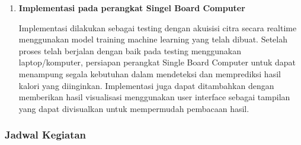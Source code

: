 \begin{enumerate} [label=\textbf{\arabic*}., listparindent=2em]
  \item \textbf{Implementasi pada perangkat Singel Board Computer}
  
  Implementasi dilakukan sebagai testing dengan akuisisi citra secara realtime menggunakan model training machine learning yang telah dibuat. Setelah proses telah berjalan dengan baik pada testing menggunakan laptop/komputer, persiapan perangkat Single Board Computer untuk dapat menampung segala kebutuhan dalam mendeteksi dan memprediksi hasil kalori yang diinginkan. Implementasi juga dapat ditambahkan dengan memberikan hasil visualisasi menggunakan user interface sebagai tampilan yang dapat divisualkan untuk mempermudah pembacaan hasil.


\end{enumerate}

\subsubsection{Jadwal Kegiatan}

